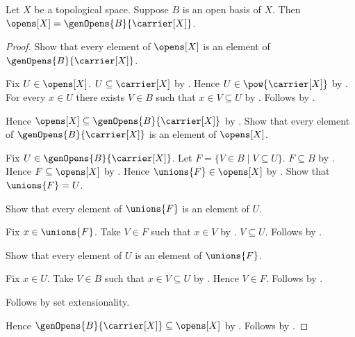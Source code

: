 \begin{theorem}\label{open_basis_generates_opens}
    Let $X$ be a topological space.
    Suppose $B$ is an open basis of $X$.
    Then $\opens[X]=\genOpens{B}{\carrier[X]}$.
\end{theorem}
\begin{proof}
    Show that every element of $\opens[X]$ is an element of
        $\genOpens{B}{\carrier[X]}$.
    \begin{subproof}
        Fix $U\in\opens[X]$.
        $U\subseteq\carrier[X]$ by .
        Hence $U\in\pow{\carrier[X]}$ by .
        For every $x\in U$ there exists $V\in B$ such that
            $x\in V\subseteq U$ by .
        Follows by .
    \end{subproof}
    Hence $\opens[X]\subseteq\genOpens{B}{\carrier[X]}$
        by .
    Show that every element of $\genOpens{B}{\carrier[X]}$ is an element of
        $\opens[X]$.
    \begin{subproof}
        Fix $U\in\genOpens{B}{\carrier[X]}$.
        Let $F=\{V\in B\mid V\subseteq U\}$.
        $F\subseteq B$ by .
        Hence $F\subseteq\opens[X]$
            by .
        Hence $\unions{F}\in\opens[X]$ by .
        Show that $\unions{F}=U$.
        \begin{subproof}
            Show that every element of $\unions{F}$ is an element of $U$.
            \begin{subproof}
                Fix $x\in\unions{F}$.
                Take $V\in F$ such that $x\in V$ by .
                $V\subseteq U$.
                Follows by .
            \end{subproof}
            Show that every element of $U$ is an element of $\unions{F}$.
            \begin{subproof}
                Fix $x\in U$.
                Take $V\in B$ such that $x\in V\subseteq U$
                    by .
                Hence $V\in F$.
                Follows by .
            \end{subproof}
            Follows by set extensionality.
        \end{subproof}
    \end{subproof}
    Hence $\genOpens{B}{\carrier[X]}\subseteq\opens[X]$
        by .
    Follows by .
\end{proof}


